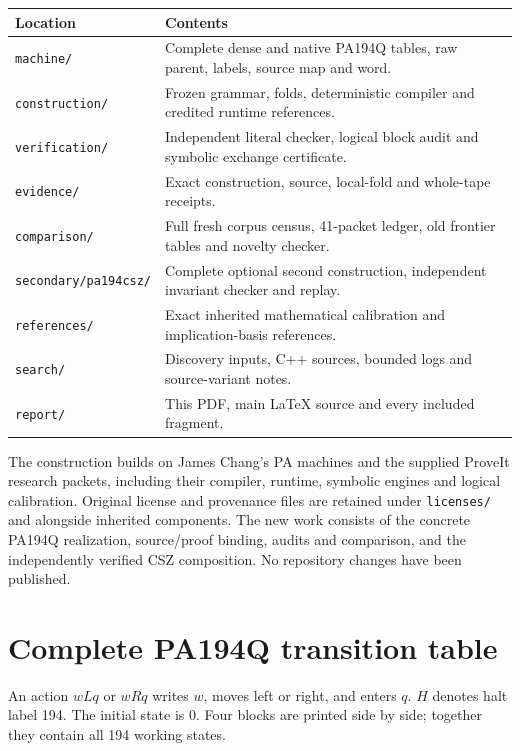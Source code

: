 \documentclass[11pt,letterpaper]{article}
\newcommand{\file}[1]{\texttt{\nolinkurl{#1}}}
\begin{document}
\begin{center}\small
\begin{tabularx}{\linewidth}{@{}lX@{}}
\toprule
Location & Contents\\\midrule
\file{machine/} & Complete dense and native PA194Q tables, raw parent, labels, source map and word.\\
\file{construction/} & Frozen grammar, folds, deterministic compiler and credited runtime references.\\
\file{verification/} & Independent literal checker, logical block audit and symbolic exchange certificate.\\
\file{evidence/} & Exact construction, source, local-fold and whole-tape receipts.\\
\file{comparison/} & Full fresh corpus census, 41-packet ledger, old frontier tables and novelty checker.\\
\file{secondary/pa194csz/} & Complete optional second construction, independent invariant checker and replay.\\
\file{references/} & Exact inherited mathematical calibration and implication-basis references.\\
\file{search/} & Discovery inputs, C++ sources, bounded logs and source-variant notes.\\
\file{report/} & This PDF, main LaTeX source and every included fragment.\\
\bottomrule
\end{tabularx}
\end{center}

The construction builds on James Chang's PA machines and the supplied
ProveIt research packets, including their compiler, runtime, symbolic
engines and logical calibration. Original license and provenance files
are retained under \file{licenses/} and alongside inherited components.
The new work consists of the concrete PA194Q realization, source/proof
binding, audits and comparison, and the independently verified CSZ
composition. No repository changes have been published.

\clearpage
\appendix
\section{Complete PA194Q transition table}\label{app:qtable}
An action $wLq$ or $wRq$ writes $w$, moves left or right, and enters $q$.
$H$ denotes halt label 194. The initial state is 0. Four blocks are printed
side by side; together they contain all 194 working states.

\end{document}
